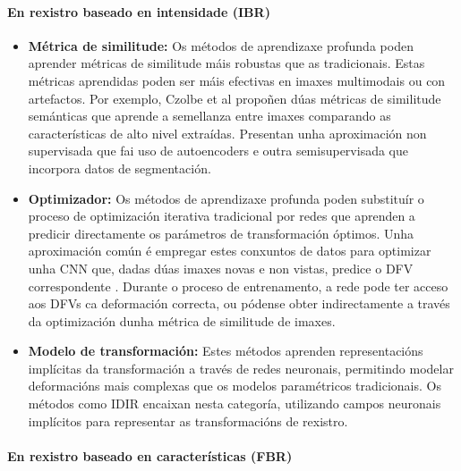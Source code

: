 \paragraph{En rexistro baseado en intensidade (IBR)}
\label{par:IBR_substitution}

\begin{itemize}
\item \textbf{Métrica de similitude:} Os métodos de aprendizaxe profunda poden aprender métricas de similitude máis robustas que as tradicionais. Estas métricas aprendidas poden ser máis efectivas en imaxes multimodais ou con artefactos.
Por exemplo, Czolbe et al \cite{semanticsimilarity} propoñen dúas métricas de similitude semánticas que aprende a semellanza entre imaxes comparando as características de alto nivel extraídas. Presentan unha aproximación non supervisada que fai uso de autoencoders e outra semisupervisada que incorpora datos de segmentación.
\item \textbf{Optimizador:} Os métodos de aprendizaxe profunda poden substituír o proceso de optimización iterativa tradicional por redes que aprenden a predicir directamente os parámetros de transformación óptimos. Unha aproximación común é empregar estes conxuntos de datos para optimizar unha CNN que, dadas dúas imaxes novas e non vistas, predice o DFV correspondente \cite{defregcnn}. Durante o proceso de entrenamento, a rede pode ter acceso aos DFVs ca deformación correcta, ou pódense obter indirectamente a través da optimización dunha métrica de similitude de imaxes.
\item \textbf{Modelo de transformación:} Estes métodos aprenden representacións implícitas da transformación a través de redes neuronais, permitindo modelar deformacións mais complexas que os modelos paramétricos tradicionais. Os métodos como IDIR \cite{wolterink2021implicit} encaixan nesta categoría, utilizando campos neuronais implícitos para representar as transformacións de rexistro.
\end{itemize}



\paragraph{En rexistro baseado en características (FBR)}
\label{par:FBR_substitution}

